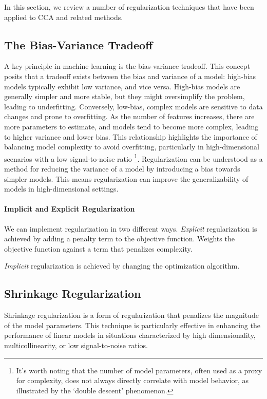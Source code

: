 In this section, we review a number of regularization techniques that have been applied to CCA and related methods.

\subsection{The Bias-Variance Tradeoff}

A key principle in machine learning is the bias-variance tradeoff.
This concept posits that a tradeoff exists between the bias and variance of a model: high-bias models typically exhibit low variance, and vice versa.
High-bias models are generally simpler and more stable, but they might oversimplify the problem, leading to underfitting.
Conversely, low-bias, complex models are sensitive to data changes and prone to overfitting.
As the number of features increases, there are more parameters to estimate, and models tend to become more complex, leading to higher variance and lower bias.
This relationship highlights the importance of balancing model complexity to avoid overfitting, particularly in high-dimensional scenarios with a low signal-to-noise ratio \citep{mcintosh2021comparison}\footnote{It's worth noting that the number of model parameters, often used as a proxy for complexity, does not always directly correlate with model behavior, as illustrated by the `double descent' phenomenon.}.
Regularization can be understood as a method for reducing the variance of a model by introducing a bias towards simpler models.
This means regularization can improve the generalizability of models in high-dimensional settings.

\paragraph{Implicit and Explicit Regularization}

We can implement regularization in two different ways.
\textit{Explicit} regularization is achieved by adding a penalty term to the objective function. Weights the objective function against a term that penalizes complexity.

\textit{Implicit} regularization is achieved by changing the optimization algorithm.

\subsection{Shrinkage Regularization}

Shrinkage regularization is a form of regularization that penalizes the magnitude of the model parameters.
This technique is particularly effective in enhancing the performance of linear models in situations characterized by high dimensionality, multicollinearity, or low signal-to-noise ratios.

